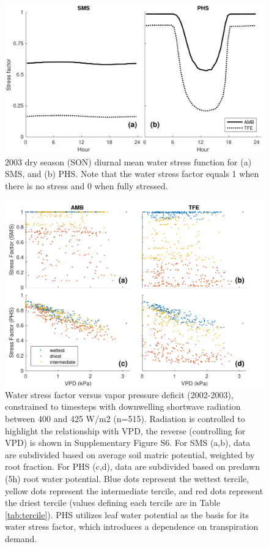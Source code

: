 \documentclass[draft,linenumbers]{agujournal}
\begin{document}
  
    \clearpage
    \begin{figure}[h]
     \centering
     \includegraphics[width=30pc]{fig5.pdf}
     \caption{2003 dry season (SON) diurnal mean water stress function for 
     (a) SMS, and
     (b) PHS.
     Note that the water stress factor equals 1 when there is no stress and 0 when fully stressed.
     }
     \label{fig:stress1}
  \end{figure}
  
      \clearpage
    \begin{figure}[h]
     \centering
     \includegraphics[width=30pc]{vpdstress.pdf}
     \caption{Water stress factor versus vapor pressure deficit (2002-2003), constrained to timesteps with downwelling shortwave radiation between 400 and 425 W/m2 (n=515).
     Radiation is controlled to highlight the relationship with VPD, the reverse (controlling for VPD) is shown in Supplementary Figure S6.
     For SMS (a,b), data are subdivided based on average soil matric potential, weighted by root fraction.
     For PHS (c,d), data are subdivided based on predawn (5h) root water potential.
     Blue dots represent the wettest tercile, yellow dots represent the intermediate tercile, and red dots represent the driest tercile (values defining each tercile are in Table \ref{tab:tercile}).
PHS utilizes leaf water potential as the basis for its water stress factor, which introduces a dependence on transpiration demand.}
     
     \label{fig:stress2}
       \end{figure}
      
\end{document}
